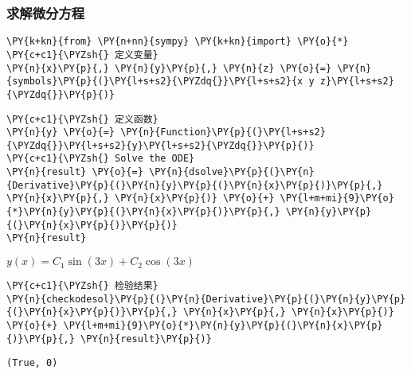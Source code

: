     \hypertarget{ux6c42ux89e3ux5faeux5206ux65b9ux7a0b}{%
\subsubsection{求解微分方程}\label{ux6c42ux89e3ux5faeux5206ux65b9ux7a0b}}

    \begin{tcolorbox}[breakable, size=fbox, boxrule=1pt, pad at break*=1mm,colback=cellbackground, colframe=cellborder]
\begin{Verbatim}[commandchars=\\\{\}]
\PY{k+kn}{from} \PY{n+nn}{sympy} \PY{k+kn}{import} \PY{o}{*}
\PY{c+c1}{\PYZsh{} 定义变量}
\PY{n}{x}\PY{p}{,} \PY{n}{y}\PY{p}{,} \PY{n}{z} \PY{o}{=} \PY{n}{symbols}\PY{p}{(}\PY{l+s+s2}{\PYZdq{}}\PY{l+s+s2}{x y z}\PY{l+s+s2}{\PYZdq{}}\PY{p}{)}
\end{Verbatim}
\end{tcolorbox}

    \begin{tcolorbox}[breakable, size=fbox, boxrule=1pt, pad at break*=1mm,colback=cellbackground, colframe=cellborder]
\begin{Verbatim}[commandchars=\\\{\}]
\PY{c+c1}{\PYZsh{} 定义函数}
\PY{n}{y} \PY{o}{=} \PY{n}{Function}\PY{p}{(}\PY{l+s+s2}{\PYZdq{}}\PY{l+s+s2}{y}\PY{l+s+s2}{\PYZdq{}}\PY{p}{)}
\PY{c+c1}{\PYZsh{} Solve the ODE}
\PY{n}{result} \PY{o}{=} \PY{n}{dsolve}\PY{p}{(}\PY{n}{Derivative}\PY{p}{(}\PY{n}{y}\PY{p}{(}\PY{n}{x}\PY{p}{)}\PY{p}{,} \PY{n}{x}\PY{p}{,} \PY{n}{x}\PY{p}{)} \PY{o}{+} \PY{l+m+mi}{9}\PY{o}{*}\PY{n}{y}\PY{p}{(}\PY{n}{x}\PY{p}{)}\PY{p}{,} \PY{n}{y}\PY{p}{(}\PY{n}{x}\PY{p}{)}\PY{p}{)}
\PY{n}{result}
\end{Verbatim}
\end{tcolorbox}
 
            
    
    $\displaystyle y{\left(x \right)} = C_{1} \sin{\left(3 x \right)} + C_{2} \cos{\left(3 x \right)}$

    

    \begin{tcolorbox}[breakable, size=fbox, boxrule=1pt, pad at break*=1mm,colback=cellbackground, colframe=cellborder]
\begin{Verbatim}[commandchars=\\\{\}]
\PY{c+c1}{\PYZsh{} 检验结果}
\PY{n}{checkodesol}\PY{p}{(}\PY{n}{Derivative}\PY{p}{(}\PY{n}{y}\PY{p}{(}\PY{n}{x}\PY{p}{)}\PY{p}{,} \PY{n}{x}\PY{p}{,} \PY{n}{x}\PY{p}{)} \PY{o}{+} \PY{l+m+mi}{9}\PY{o}{*}\PY{n}{y}\PY{p}{(}\PY{n}{x}\PY{p}{)}\PY{p}{,} \PY{n}{result}\PY{p}{)}
\end{Verbatim}
\end{tcolorbox}

            \begin{tcolorbox}[breakable, size=fbox, boxrule=.5pt, pad at break*=1mm, opacityfill=0]
\begin{Verbatim}[commandchars=\\\{\}]
(True, 0)
\end{Verbatim}
\end{tcolorbox}

